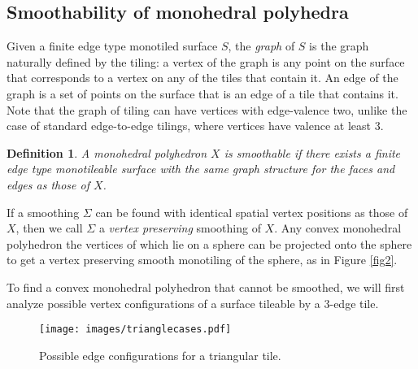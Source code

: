 \documentclass[11pt]{amsart}
\newtheorem{definition}[theorem]{Definition}
\theoremstyle{remark}
\newcounter{case}
\begin{document}
\subsection{Smoothability of monohedral polyhedra} \label{smoothability}
Given a finite edge type monotiled surface $S$, the \emph{graph} of $S$ is the graph naturally defined by the tiling: a vertex of the graph is any point on the surface that corresponds to a vertex on any of the tiles that contain it. An edge of the graph is a set of points on the surface that is an edge of a tile that contains it.  Note that the graph of tiling can have vertices with edge-valence two, unlike the case of standard edge-to-edge tilings, where vertices have valence at least 3.  
\begin{definition}
A monohedral polyhedron $X$ is \emph{smoothable} if there exists a finite edge type monotileable surface with the same graph structure for the faces and edges as those of $X$.  
\end{definition}
If a smoothing $\Sigma$ can be found with identical spatial vertex positions as those of $X$, then we call $\Sigma$ a \emph{vertex preserving} smoothing of $X$. 
Any convex monohedral polyhedron the vertices of which lie on a sphere  can be projected onto the sphere to get 
a vertex preserving smooth monotiling of the sphere, as in Figure \ref{fig2}.  

To find a convex monohedral polyhedron that cannot be smoothed, we will first analyze 
possible vertex configurations of a surface tileable by a 3-edge tile.



\begin{figure}[h!tbp]
	\begin{center}
	\texttt{[image: images/trianglecases.pdf]}  
		\end{center}
	\caption{Possible edge configurations for a triangular tile.}
	\label{fig:3edges}
\end{figure}
\end{document}
